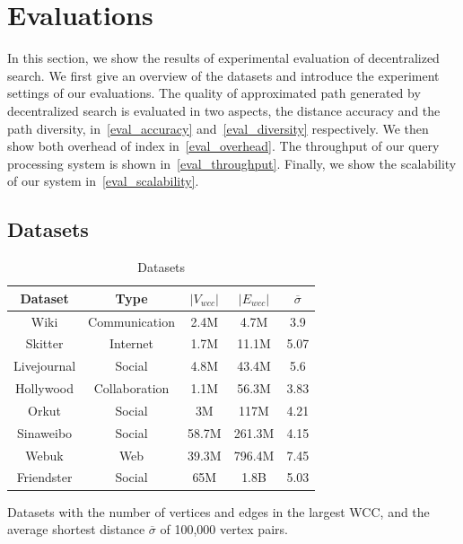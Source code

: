 \section{Evaluations}
\label{evaluation}

In this section, we show the results of experimental evaluation of decentralized search. We first give an overview of the datasets and introduce the experiment settings of our evaluations. The quality of approximated path generated by decentralized search is evaluated in two aspects, the distance accuracy and the path diversity, in~\ref{eval_accuracy} and~\ref{eval_diversity} respectively. We then show both overhead of index in~\ref{eval_overhead}. The throughput of our query processing system is shown in~\ref{eval_throughput}. Finally, we show the scalability of our system in~\ref{eval_scalability}.

\subsection{Datasets}
\label{eval_datasets}

\begin{table}
		\vspace{-0.5cm}
		\caption{Datasets}
		\label{table:datasets}
		\begin{threeparttable}
			\centering
			\begin{tabular}{c|cccc} \hline
				Dataset & Type & $|V_{wcc}|$ & $|E_{wcc}|$ & $\overline{\sigma}$ \\ \hline
				Wiki & Communication & 2.4M & 4.7M & 3.9 \\ 
				Skitter & Internet & 1.7M & 11.1M & 5.07 \\ 
				Livejournal & Social & 4.8M & 43.4M & 5.6 \\ 
				Hollywood & Collaboration & 1.1M & 56.3M & 3.83 \\ 
				Orkut & Social & 3M & 117M & 4.21 \\ 
				Sinaweibo & Social & 58.7M & 261.3M & 4.15 \\ 
				Webuk & Web & 39.3M & 796.4M & 7.45 \\ 
				Friendster & Social & 65M & 1.8B & 5.03 \\ \hline
			\end{tabular}
			\begin{tablenotes}
				\item Datasets with the number of vertices and edges in the largest WCC, and the average shortest distance $\overline{\sigma}$ of 100,000 vertex pairs.
			\end{tablenotes}
		\end{threeparttable}
		\vspace{-0.3cm}
\end{table}

